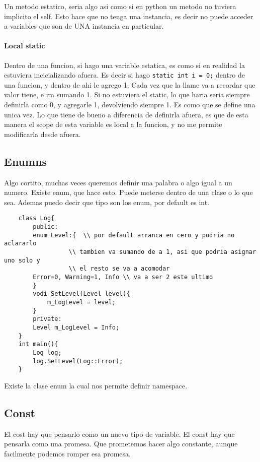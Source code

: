 \documentclass[11pt]{article}
\begin{document}
Un metodo estatico, seria algo asi como si en python un metodo no
tuviera implicito el self.
Esto hace que no tenga una instancia, es decir no puede acceder a variables que son
de UNA instancia en particular.

\paragraph{Local static}
Dentro de una funcion, si hago una variable estatica, es como si en realidad la
estuviera incicializando afuera.
Es decir si hago \texttt{static int i = 0;} dentro de una funcion, y dentro de ahi
le agrego 1.
Cada vez que la llame va a recordar que valor tiene, e ira sumando 1.
Si no estuviera el static, lo que haria seria siempre definirla como 0, y agregarle
1, devolviendo siempre 1.
Es como que se define una unica vez.
Lo que tiene de bueno a diferencia de definirla afuera, es que de esta manera
el scope de esta variable es local a la funcion, y no me permite modificarla
desde afuera.

\subsection{Enumns}
Algo cortito, muchas veces queremos definir una palabra o algo igual a un numero.
Existe enum, que hace esto.
Puede meterse dentro de una clase o lo que sea.
Ademas puedo decir que tipo son los enum, por default es int.
\begin{lstlisting}
    class Log{
        public:
        enum Level:{  \\ por default arranca en cero y podria no aclararlo
                  \\ tambien va sumando de a 1, asi que podria asignar uno solo y
                  \\ el resto se va a acomodar
        Error=0, Warning=1, Info \\ va a ser 2 este ultimo
        }
        vodi SetLevel(Level level){
            m_LogLevel = level;
        }
        private:
        Level m_LogLevel = Info;
    }
    int main(){
        Log log;
        log.SetLevel(Log::Error);
    }
\end{lstlisting}


Existe la clase enum la cual nos permite definir namespace.





\subsection{Const}
El cost hay que pensarlo como un nuevo tipo de variable.
El const hay que pensarla como una promesa.
Que prometemos hacer algo constante, aunque facilmente podemos romper esa promesa.
\end{document}
